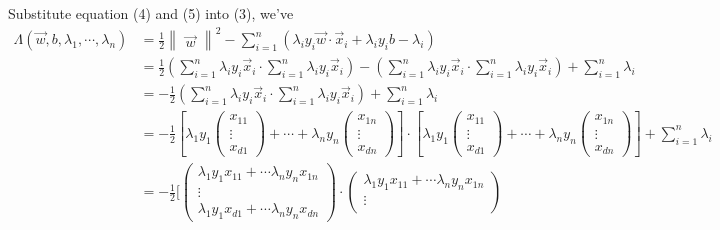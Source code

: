 \documentclass{article}
\begin{document}
Substitute equation (4) and (5) into (3), we've
\begin{align}
    \Lambda (\Vec{w}, b, \lambda_1, \cdots, \lambda_n) &=
    \frac{1}{2}\begin{Vmatrix} \Vec{w} \end{Vmatrix}^2 -
    \displaystyle\sum_{i=1}^{n} (\lambda_i y_i \Vec{w}\cdot\Vec{x}_i +\lambda_i y_i b - \lambda_i) \nonumber \\
    &= \frac{1}{2} (\displaystyle\sum_{i=1}^{n} \lambda_i y_i\Vec{x}_i \cdot
    \displaystyle\sum_{i=1}^{n} \lambda_i y_i\Vec{x}_i) -
    (\displaystyle\sum_{i=1}^{n} \lambda_i y_i\Vec{x}_i \cdot
    \displaystyle\sum_{i=1}^{n} \lambda_i y_i\Vec{x}_i) + \displaystyle\sum_{i=1}^{n} \lambda_i \nonumber \\
    &= - \frac{1}{2} (\displaystyle\sum_{i=1}^{n} \lambda_i y_i\Vec{x}_i \cdot
    \displaystyle\sum_{i=1}^{n} \lambda_i y_i\Vec{x}_i) + \displaystyle\sum_{i=1}^{n} \lambda_i \nonumber \\
    &= - \frac{1}{2}[\lambda_1 y_1 \begin{pmatrix} x_{11} \\ \vdots \\x_{d1} \end{pmatrix} + \cdots + \lambda_n y_n \begin{pmatrix} x_{1n} \\ \vdots \\x_{dn} \end{pmatrix}] \cdot [\lambda_1 y_1 \begin{pmatrix} x_{11} \\ \vdots \\x_{d1} \end{pmatrix} + \cdots + \lambda_n y_n \begin{pmatrix} x_{1n} \\ \vdots \\x_{dn} \end{pmatrix}] + \displaystyle\sum_{i=1}^{n} \lambda_i \nonumber \\
    &= - \frac{1}{2}[\begin{pmatrix} 
    \lambda_1 y_1 x_{11} + \cdots \lambda_n y_n x_{1n} \\ \vdots \\
    \lambda_1 y_1 x_{d1} + \cdots \lambda_n y_n x_{dn} \end{pmatrix}
    \cdot \begin{pmatrix} 
    \lambda_1 y_1 x_{11} + \cdots \lambda_n y_n x_{1n} \\ \vdots \\

\end{pmatrix}
\end{align}
\end{document}
